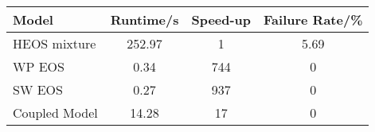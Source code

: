 \begin{tabular}{|p{7em} | c | c | c |}
    \hline
    \rowcolor{bluepoli!40}
    \textbf{Model} & \textbf{Runtime}/\unit{\s} & \textbf{Speed-up} & \textbf{Failure Rate}/\unit{\percent} \T\B \\
    \hline \hline 
    \ac{HEOS} mixture & 252.97 & 1 & 5.69 \T\B\\
    \ac{WP} \ac{EOS}  & 0.34 & 744 & 0 \T\B\\
    \ac{SW} \ac{EOS} & 0.27 & 937 & 0 \T\B\\
    Coupled Model & 14.28 & 17 & 0 \T\B\\
    \hline
\end{tabular}
